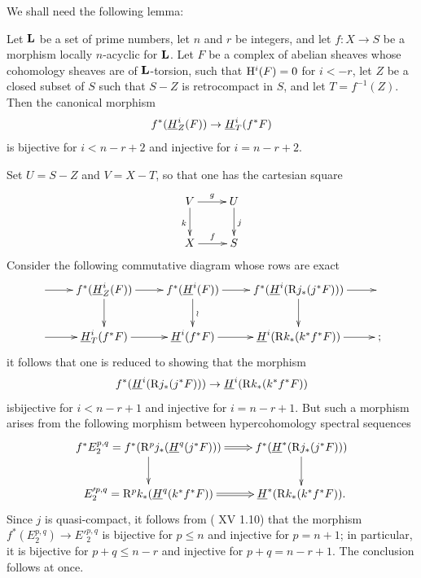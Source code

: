 We shall need the following lemma:

\begin{sublemme} \label{XIV.1.13.1}
Let $\mathbf L$ be a set of prime numbers, let $n$ and $r$ be integers, and let $f:X\to S$ be a morphism locally $n$-acyclic for $\mathbf L$. Let $F$ be a complex of abelian sheaves whose cohomology sheaves are of $\mathbf L$-torsion, such that $\mathrm H^i(F)=0$ for $i<-r$, let $Z$ be a closed subset of $S$ such that $S-Z$ is retrocompact in $S$, and let $T=f^{-1}(Z)$. Then the canonical morphism
$$f^*({\mathop{\underline{H}}\nolimits}_Z^i(F))\to {\mathop{\underline{H}}\nolimits}_T^i(f^*F)$$
is bijective for $i<n-r+2$ and injective for $i=n-r+2$.
\end{sublemme}

Set $U=S-Z$ and $V=X-T$, so that one has the cartesian square
$$
\xymatrix{
V \ar[r]^-g\ar[d]_k& U\ar[d]^j\\
X \ar[r]^-f&S
}$$
Consider the following commutative diagram whose rows are exact
$$
\xymatrix{ \ar[r]&f^*({\h}_Z^i(F))\ar[r]\ar[d]& f^*({\h}^i(F))\ar[r]\ar[d]^{\wr} &f^*({\h}^i(\R j_*(j^*F)))\ar[r]\ar[d]& \\
\ar[r] &{\h}_T^i(f^*F)\ar[r]& {\h}^i(f^*F) \ar[r]&{\h}^i(\R k_*(k^*f^*F)) \ar[r]&\text{;}}$$
it follows that one is reduced to showing that the morphism
$$f^*({\mathop{\underline{H}}\nolimits}^i(\mathrm R j_*(j^*F)))\to {\mathop{\underline{H}}\nolimits}^i(\mathrm R k_*(k^*f^*F))$$
is\pageoriginale bijective for $i<n-r+1$ and injective for $i=n-r+1$. But such a morphism arises from the following morphism between hypercohomology spectral sequences
$$
\xymatrix{f^*E_2^{p, q}=f^*(\R^pj_*({\h}^q(j^*F)))\ar@{=>} [r]\ar[d]&f^*({\h}^*(\R j_*(j^*F)))\ar[d]\\
E'^{p, q}_2=\R^pk_*({\h}^q(k^*f^*F))\ar@{=>}[r]&{\h}^*(\R k_*(k^*f^*F)).}
$$
Since $j$ is quasi-compact, it follows from ( XV 1.10) that the morphism $f^*(E^{p, q}_2)\to E'^{p, q}_2$ is bijective for $p\leq n$ and injective for $p=n+1$; in particular, it is bijective for $p+q\leq n-r$ and injective for $p+q=n-r+1$. The conclusion follows at once.

